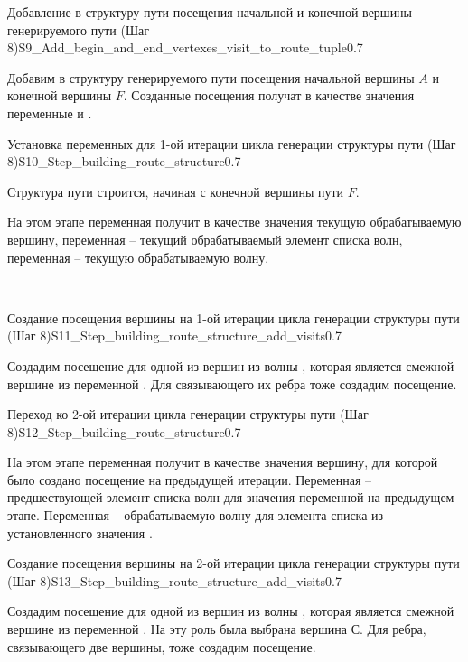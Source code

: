 \begin{algostep}{Добавление в структуру пути посещения начальной и
    конечной вершины генерируемого пути (Шаг
    8)}{S9_Add_begin_and_end_vertexes_visit_to_route_tuple}{0.7}
 
  Добавим в структуру генерируемого пути посещения начальной вершины
  $A$ и конечной вершины $F$. Созданные посещения получат в качестве
  значения переменные  и
  .
\end{algostep}


\begin{algostep}{Установка переменных для 1-ой итерации цикла генерации
    структуры пути (Шаг 8)}{S10_Step_building_route_structure}{0.7}
  
  Структура пути строится, начиная с конечной вершины пути $F$.

  На этом этапе переменная  получит в качестве
  значения текущую обрабатываемую вершину, переменная 
  – текущий обрабатываемый элемент списка волн, переменная
   – текущую обрабатываемую волну.
\end{algostep}

 
\begin{algostep}{Создание посещения вершины на 1-ой итерации цикла
    генерации структуры пути (Шаг
    8)}{S11_Step_building_route_structure_add_visits}{0.7}
 
  Создадим посещение для одной из вершин из волны ,
  которая является смежной вершине из переменной
  . Для связывающего их ребра тоже создадим
  посещение.
\end{algostep}  


\begin{algostep}{Переход ко 2-ой итерации цикла генерации структуры
    пути (Шаг 8)}{S12_Step_building_route_structure}{0.7}
 
  На этом этапе переменная  получит в качестве
  значения вершину, для которой было создано посещение на предыдущей
  итерации. Переменная  – предшествующей элемент
  списка волн для значения переменной  на предыдущем
  этапе. Переменная  – обрабатываемую волну для
  элемента списка из установленного значения .
\end{algostep}


\begin{algostep}{Создание посещения вершины на 2-ой итерации цикла
    генерации структуры пути (Шаг
    8)}{S13_Step_building_route_structure_add_visits}{0.7}

  Создадим посещение для одной из вершин из волны ,
  которая является смежной вершине из переменной
  . На эту роль была выбрана вершина $С$. Для
  ребра, связывающего две вершины, тоже создадим посещение.
\end{algostep}


